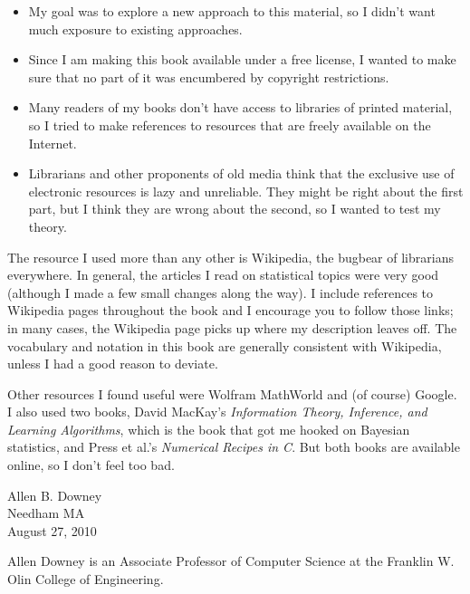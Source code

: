 \documentclass[12pt]{book}
\begin{document}
\begin{itemize}

\item My goal was to explore a new approach to this material, so I didn't
want much exposure to existing approaches.

\item Since I am making this book available under a free license, I wanted
to make sure that no part of it was encumbered by copyright restrictions.

\item Many readers of my books don't have access to libraries of
printed material, so I tried to make references to resources that are
freely available on the Internet.

\item Librarians and other proponents of old media think that the exclusive
use of electronic resources is lazy and unreliable.  They might be right
about the first part, but I think they are wrong about the second, so
I wanted to test my theory.


\end{itemize}

The resource I used more than any other is Wikipedia, the bugbear
of librarians everywhere.  In general, the articles I read on
statistical topics were very good (although I made a few small changes
along the way).  I include references to Wikipedia pages throughout
the book and I encourage you to follow those links; in many cases, the
Wikipedia page picks up where my description leaves off.  The
vocabulary and notation in this book are generally consistent with
Wikipedia, unless I had a good reason to deviate.

Other resources I found useful were Wolfram MathWorld and (of course)
Google.  I also used two books, David MacKay's {\em Information
  Theory, Inference, and Learning Algorithms}, which is the book that
got me hooked on Bayesian statistics, and Press et al.'s {\em
  Numerical Recipes in C}.  But both books are available online,
so I don't feel too bad.

Allen B. Downey \\
Needham MA\\
August 27, 2010

Allen Downey is an Associate Professor of Computer Science at 
the Franklin W. Olin College of Engineering.
\end{document}
